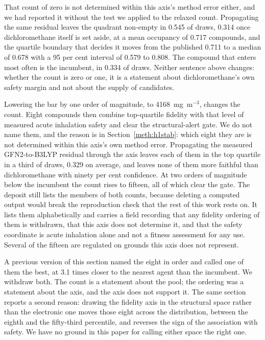 \documentclass[11pt,a4paper]{article}
\begin{document}
That count of zero is not determined within this axis's method error either,
and we had reported it without the test we applied to the relaxed count.
Propagating the same residual leaves the quadrant non-empty in 0.545 of draws,
0.314 once dichloromethane itself is set aside, at a mean occupancy of 0.717
compounds, and the quartile boundary that decides it moves from the published
0.711 to a median of 0.678 with a 95 per cent interval of 0.579 to 0.808. The
compound that enters most often is the incumbent, in 0.334 of draws. Neither
sentence above changes: whether the count is zero or one, it is a statement
about dichloromethane's own safety margin and not about the supply of
candidates.

Lowering the bar by one order of magnitude, to 4168~mg~m$^{-3}$, changes the
count. Eight compounds then combine top-quartile fidelity with that level of
measured acute inhalation safety and clear the structural-alert gate. We do not
name them, and the reason is in Section~\ref{meth:h1stab}: which eight they are
is not determined within this axis's own method error. Propagating the measured
GFN2-to-B3LYP residual through the axis leaves each of them in the top quartile
in a third of draws, 0.329 on average, and leaves none of them more faithful
than dichloromethane with ninety per cent confidence. At two orders of magnitude
below the incumbent the count rises to fifteen, all of which clear the gate.
The deposit still lists the members of both counts, because deleting a computed
output would break the reproduction check that the rest of this work rests on.
It lists them alphabetically and carries a field recording that any fidelity
ordering of them is withdrawn, that this axis does not determine it, and that
the safety coordinate is acute inhalation alone and not a fitness assessment
for any use. Several of the fifteen are regulated on grounds this axis does not
represent.

\begin{sloppypar}
A previous version of this section named the eight in order and called one of
them the best, at 3.1 times closer to the nearest agent than the incumbent. We
withdraw both. The count is a statement about the pool; the ordering was a
statement about the axis, and the axis does not support it. The same section
reports a second reason: drawing the fidelity axis in the structural space
rather than the electronic one moves those eight across the distribution,
between the eighth and the fifty-third percentile, and reverses the sign of the
association with safety. We have no ground in this paper for calling either
space the right one.
\end{sloppypar}
\end{document}
